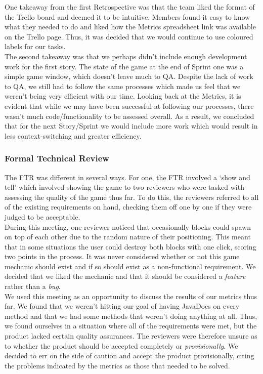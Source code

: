 \documentclass[12pt]{article}
\begin{document}
One takeaway from the first Retrospective was that the team liked the format of the Trello board and deemed it to be intuitive. Members found it easy to know what they needed to do and liked how the Metrics spreadsheet link was available on the Trello page. Thus, it was decided that we would continue to use coloured labels for our tasks. \\

The second takeaway was that we perhaps didn't include enough development work for the first story. The state of the game at the end of Sprint one was a simple game window, which doesn't leave much to QA. Despite the lack of work to QA, we still had to follow the same processes which made us feel that we weren't being very efficient with our time. Looking back at the Metrics, it is evident that while we may have been successful at following our processes, there wasn't much code/functionality to be assessed overall. As a result, we concluded that for the next Story/Sprint we would include more work which would result in less context-switching and greater efficiency.

\subsubsection{Formal Technical Review}

The FTR was different in several ways. For one, the FTR involved a `show and tell' which involved showing the game to two reviewers who were tasked with assessing the quality of the game thus far. To do this, the reviewers referred to all of the existing requirements on hand, checking them off one by one if they were judged to be acceptable. \\

During this meeting, one reviewer noticed that occasionally blocks could spawn on top of each other due to the random nature of their positioning. This meant that in some situations the user could destroy both blocks with one click, scoring two points in the process. It was never considered whether or not this game mechanic should exist and if so should exist as a non-functional requirement. We decided that we liked the mechanic and that it should be considered a \emph{feature} rather than a \emph{bug}. \\

We used this meeting as an opportunity to discuss the results of our metrics thus far. We found that we weren't hitting our goal of having JavaDocs on every method and that we had some methods that weren't doing anything at all. Thus, we found ourselves in a situation where all of the requirements were met, but the product lacked certain quality assurances. The reviewers were therefore unsure as to whether the product should be accepted completely or \emph{provisionally}. We decided to err on the side of caution and accept the product provisionally, citing the problems indicated by the metrics as those that needed to be solved.
\end{document}
